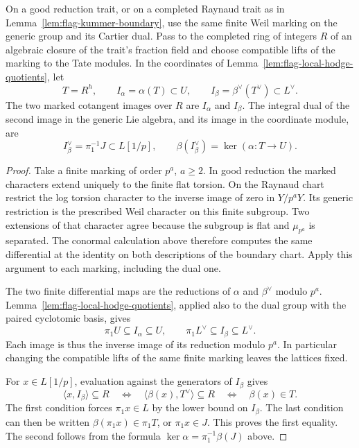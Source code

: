 \begin{auxlemma}\label{lem:flag-valuative-image-dual}
On a good reduction trait, or on a completed Raynaud trait as in Lemma~\ref{lem:flag-kummer-boundary}, use the same finite Weil marking on the generic group and its Cartier dual. Pass to the completed ring of integers \(R\) of an algebraic closure of the trait's fraction field and choose compatible lifts of the marking to the Tate modules. In the coordinates of Lemma~\ref{lem:flag-local-hodge-quotients}, let
\[
 T=R^h,\qquad I_\alpha=\alpha(T)\subset U,\qquad
 I_\beta=\beta^\vee(T^\vee)\subset L^\vee .
\]
The two marked cotangent images over \(R\) are \(I_\alpha\) and \(I_\beta\). The integral dual of the second image in the generic Lie algebra, and its image in the coordinate module, are
\[
 I_\beta^\vee=\pi_1^{-1}J\subset L[1/p],
 \qquad \beta(I_\beta^\vee)=\ker(\alpha:T\to U).
\]
\end{auxlemma}
\begin{proof}
Take a finite marking of order \(p^a\), \(a\ge2\). In good reduction the marked characters extend uniquely to the finite flat torsion. On the Raynaud chart restrict the log torsion character to the inverse image of zero in \(Y/p^aY\). Its generic restriction is the prescribed Weil character on this finite subgroup. Two extensions of that character agree because the subgroup is flat and \(\mu_{p^a}\) is separated. The conormal calculation above therefore computes the same differential at the identity on both descriptions of the boundary chart. Apply this argument to each marking, including the dual one.

The two finite differential maps are the reductions of \(\alpha\) and \(\beta^\vee\) modulo \(p^a\). Lemma~\ref{lem:flag-local-hodge-quotients}, applied also to the dual group with the paired cyclotomic basis, gives
\[
 \pi_1U\subseteq I_\alpha\subseteq U,\qquad
 \pi_1L^\vee\subseteq I_\beta\subseteq L^\vee.
\]
Each image is thus the inverse image of its reduction modulo \(p^a\). In particular changing the compatible lifts of the same finite marking leaves the lattices fixed.

For \(x\in L[1/p]\), evaluation against the generators of \(I_\beta\) gives
\[
 \langle x,I_\beta\rangle\subseteq R
 \quad\Longleftrightarrow\quad
 \langle\beta(x),T^\vee\rangle\subseteq R
 \quad\Longleftrightarrow\quad \beta(x)\in T .
\]
The first condition forces \(\pi_1x\in L\) by the lower bound on \(I_\beta\). The last condition can then be written \(\beta(\pi_1x)\in\pi_1T\), or \(\pi_1x\in J\). This proves the first equality. The second follows from the formula \(\ker\alpha=\pi_1^{-1}\beta(J)\) above.
\end{proof}

